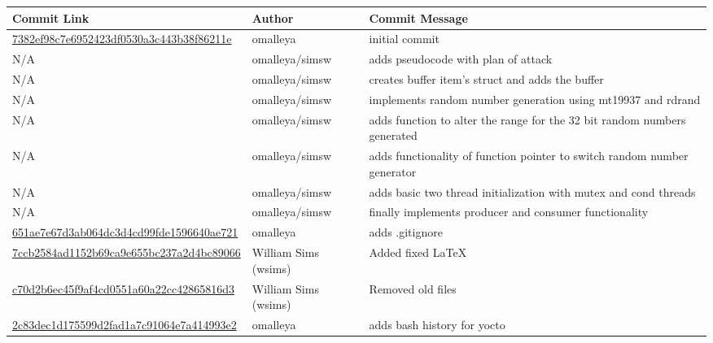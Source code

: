 \documentclass[10pt,letterpaper,draftclsnofoot,onecolumn]{IEEEtran}
\begin{document}
\begin{center}
    \begin{tabular}{ | p{8cm} | p{3cm} | p{6cm} |}
    \hline
    Commit Link & Author & Commit Message \\ \hline
    \href{https://github.com/omalleya/cs444-concurrency-writeups/commit/7382ef98c7e6952423df0530a3c443b38f86211e}{7382ef98c7e6952423df0530a3c443b38f86211e} & omalleya & initial commit \\ \hline
    N/A & omalleya/simsw & adds pseudocode with plan of attack \\ \hline
    N/A & omalleya/simsw & creates buffer item’s struct and adds the buffer \\ \hline
    N/A & omalleya/simsw & {implements random number generation \newline using mt19937 and rdrand} \\ \hline
    N/A & omalleya/simsw & adds function to alter the range for \newline the 32 bit random numbers generated \\ \hline
    N/A & omalleya/simsw & adds functionality of function pointer \newline to switch random number generator \\ \hline
    N/A & omalleya/simsw & adds basic two thread initialization \newline with mutex and cond threads \\ \hline
    N/A & omalleya/simsw & finally implements producer and \newline consumer functionality \\ \hline
    \href{https://github.com/omalleya/cs444-concurrency-writeups/commit/651ae7e67d3ab064dc3d4cd99fde1596640ae721}{651ae7e67d3ab064dc3d4cd99fde1596640ae721} & omalleya & adds .gitignore \\ \hline
    \href{https://github.com/omalleya/cs444-concurrency-writeups/commit/7ccb2584ad1152b69ca9e655bc237a2d4bc89066}{7ccb2584ad1152b69ca9e655bc237a2d4bc89066} & William Sims (wsims) & Added fixed LaTeX \\ \hline
    \href{https://github.com/omalleya/cs444-concurrency-writeups/commit/c70d2b6ec45f9af4cd0551a60a22cc42865816d3}{c70d2b6ec45f9af4cd0551a60a22cc42865816d3} & William Sims (wsims) & Removed old files \\ \hline
    \href{https://github.com/omalleya/cs444-concurrency-writeups/commit/2c83dec1d175599d2fad1a7c91064e7a414993e2}{2c83dec1d175599d2fad1a7c91064e7a414993e2} & omalleya & adds bash history for yocto \\ \hline

\end{tabular}
\end{center}
\end{document}
